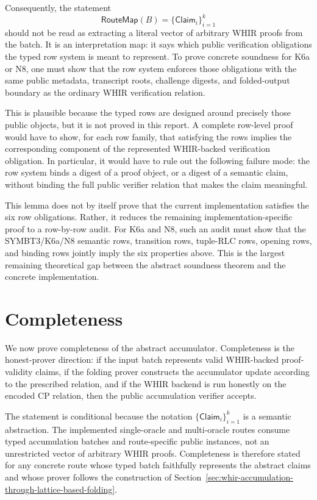 \documentclass[11pt]{article}
\theoremstyle{definition}
\begin{document}
Consequently, the statement
\[
  \mathsf{RouteMap}(B)=\{\mathsf{Claim}_i\}_{i=1}^k
\]
should not be read as extracting a literal vector of arbitrary WHIR proofs from
the batch. It is an interpretation map: it says which public verification
obligations the typed row system is meant to represent. To prove concrete
soundness for K6a or N8, one must show that the row system enforces those
obligations with the same public metadata, transcript roots, challenge digests,
and folded-output boundary as the ordinary WHIR verification relation.

This is plausible because the typed rows are designed around precisely those
public objects, but it is not proved in this report. A complete row-level proof
would have to show, for each row family, that satisfying the rows implies the
corresponding component of the represented WHIR-backed verification obligation.
In particular, it would have to rule out the following failure mode: the row
system binds a digest of a proof object, or a digest of a semantic claim, without
binding the full public verifier relation that makes the claim meaningful.

This lemma does not by itself prove that the current implementation satisfies
the six row obligations. Rather, it reduces the remaining implementation-specific
proof to a row-by-row audit. For K6a and N8, such an audit must show that the
SYMBT3/K6a/N8 semantic rows, transition rows, tuple-RLC rows, opening rows, and
binding rows jointly imply the six properties above. This is the largest
remaining theoretical gap between the abstract soundness theorem and the
concrete implementation.

\section{Completeness}
\label{sec:completeness}

We now prove completeness of the abstract accumulator. Completeness is the
honest-prover direction: if the input batch represents valid WHIR-backed
proof-validity claims, if the folding prover constructs the accumulator update
according to the prescribed relation, and if the WHIR backend is run honestly on
the encoded CP relation, then the public accumulation verifier accepts.

The statement is conditional because the notation
$\{\mathsf{Claim}_i\}_{i=1}^k$ is a semantic abstraction. The implemented
single-oracle and multi-oracle routes consume typed accumulation batches and
route-specific public instances, not an unrestricted vector of arbitrary WHIR
proofs. Completeness is therefore stated for any concrete route whose typed
batch faithfully represents the abstract claims and whose prover follows the
construction of Section~\ref{sec:whir-accumulation-through-lattice-based-folding}.
\end{document}
